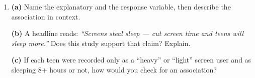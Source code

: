 \documentclass[12pt]{article}
\begin{document}
\begin{enumerate}[leftmargin=1.9em, itemsep=0.06in, topsep=4pt, resume]

  \boxguard[14]
  \item \textbf{(a)} Name the explanatory and the response variable, then describe the
        association in context.\\[4pt]

        \vspace{4pt}
        \boxguard[14]
        \textbf{(b)} A headline reads: \emph{``Screens steal sleep --- cut screen time and teens
        will sleep more.''} Does this study support that claim? Explain.\\[4pt]

        \vspace{4pt}
        \boxguard[14]
        \textbf{(c)} If each teen were recorded only as a ``heavy'' or ``light'' screen user and
        as sleeping 8+ hours or not, how would you check for an association?\\[4pt]

\end{enumerate}
\end{document}
